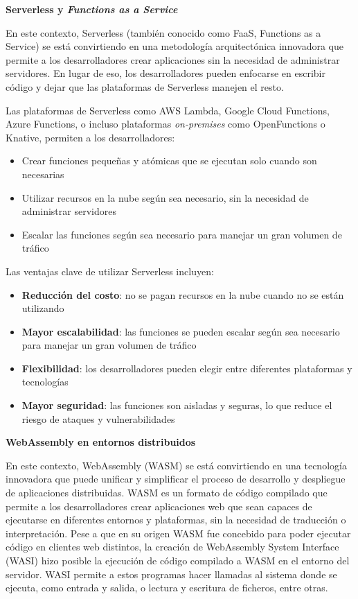 \textbf{Serverless y \textit{Functions as a Service}}

En este contexto, Serverless (también conocido como FaaS, Functions as a Service) se está convirtiendo en una metodología arquitectónica innovadora que permite a los desarrolladores crear aplicaciones sin la necesidad de administrar servidores. En lugar de eso, los desarrolladores pueden enfocarse en escribir código y dejar que las plataformas de Serverless manejen el resto.

Las plataformas de Serverless como AWS Lambda, Google Cloud Functions, Azure Functions, o incluso plataformas \textit{on-premises} como OpenFunctions o Knative, permiten a los desarrolladores:

\begin{itemize}
    \item Crear funciones pequeñas y atómicas que se ejecutan solo cuando son necesarias
    \item Utilizar recursos en la nube según sea necesario, sin la necesidad de administrar servidores
    \item Escalar las funciones según sea necesario para manejar un gran volumen de tráfico
\end{itemize}

Las ventajas clave de utilizar Serverless incluyen:

\begin{itemize}
    \item \textbf{Reducción del costo}: no se pagan recursos en la nube cuando no se están utilizando
    \item \textbf{Mayor escalabilidad}: las funciones se pueden escalar según sea necesario para manejar un gran volumen de tráfico
    \item \textbf{Flexibilidad}: los desarrolladores pueden elegir entre diferentes plataformas y tecnologías
    \item \textbf{Mayor seguridad}: las funciones son aisladas y seguras, lo que reduce el riesgo de ataques y vulnerabilidades
\end{itemize}

\textbf{WebAssembly en entornos distribuidos}

En este contexto, WebAssembly (WASM) se está convirtiendo en una tecnología innovadora que puede unificar y simplificar el proceso de desarrollo y despliegue de aplicaciones distribuidas. WASM es un formato de código compilado que permite a los desarrolladores crear aplicaciones web que sean capaces de ejecutarse en diferentes entornos y plataformas, sin la necesidad de traducción o interpretación. Pese a que en su origen WASM fue concebido para poder ejecutar código en clientes web distintos, la creación de WebAssembly System Interface (WASI) hizo posible la ejecución de código compilado a WASM en el entorno del servidor. WASI permite a estos programas hacer llamadas al sistema donde se ejecuta, como entrada y salida, o lectura y escritura de ficheros, entre otras.

